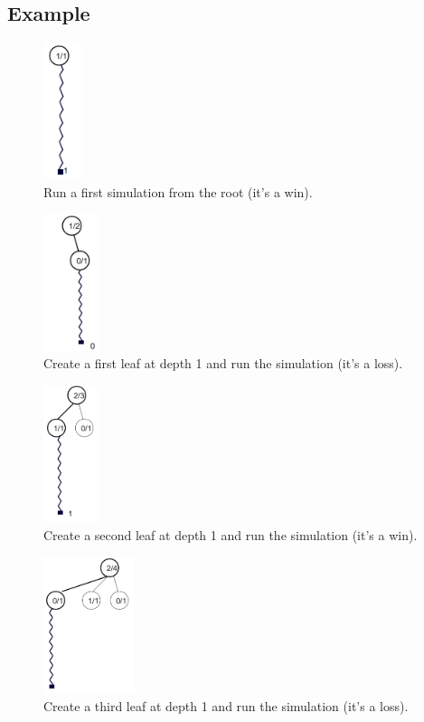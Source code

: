 \documentclass[12pt]{article}
\begin{document}
\subsection{Example}
\label{sec:example}
\begin{figure}[H]
\centering
\includegraphics[height=4cm]{img/1.png}
\caption{\label{fig:1}Run a first simulation from the root (it's a win).}
\end{figure}
\begin{figure}[H]
\centering
\includegraphics[height=4cm]{img/2.png}
\caption{\label{fig:2}Create a first leaf at depth 1 and run the simulation (it's a loss).}
\end{figure}
\begin{figure}[H]
\centering
\includegraphics[height=4cm]{img/3.png}
\caption{\label{fig:3}Create a second leaf at depth 1 and run the simulation (it's a win).}
\end{figure}
\begin{figure}[H]
\centering
\includegraphics[height=4cm]{img/4.png}
\caption{\label{fig:4}Create a third leaf at depth 1 and run the simulation (it's a loss).}
\end{figure}
\end{document}
